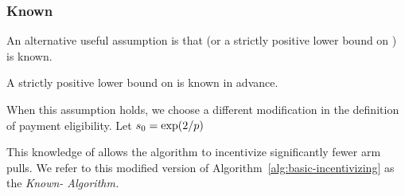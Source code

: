 \subsubsection{Known \MinProb}
An alternative useful assumption is that \MinProb
(or a strictly positive lower bound on \MinProb) is known. 

\begin{assumption}
\label{a:known-p}
A strictly positive lower bound on \MinProb is known in advance.
\end{assumption}

When this assumption holds, we choose a different modification in the
definition of payment eligibility.
Let $s_0 = \exp(2/p)$ 


This knowledge of \MinProb allows the algorithm to incentivize
significantly fewer arm pulls.
We refer to this modified version of
Algorithm~\ref{alg:basic-incentivizing} as the \emph{Known-\MinProb
Algorithm.}




